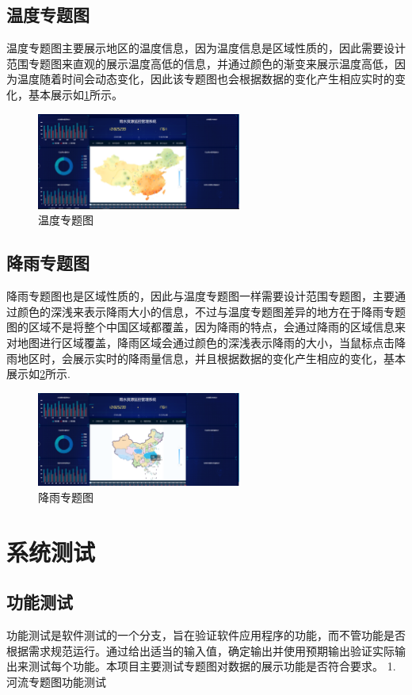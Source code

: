 \subsection{温度专题图}
温度专题图主要展示地区的温度信息，因为温度信息是区域性质的，因此需要设计范围专题图来直观的展示温度高低的信息，并通过颜色的渐变来展示温度高低，因为温度随着时间会动态变化，因此该专题图也会根据数据的变化产生相应实时的变化，基本展示如\ref{fig:wendu}所示。
\begin{figure}[!htb]%
	\centering
	\includegraphics[width=0.60\textwidth]{figs/温度图.png}
	\caption{温度专题图}
	\label{fig:wendu}
\end{figure}
\subsection{降雨专题图}
降雨专题图也是区域性质的，因此与温度专题图一样需要设计范围专题图，主要通过颜色的深浅来表示降雨大小的信息，不过与温度专题图差异的地方在于降雨专题图的区域不是将整个中国区域都覆盖，因为降雨的特点，会通过降雨的区域信息来对地图进行区域覆盖，降雨区域会通过颜色的深浅表示降雨的大小，当鼠标点击降雨地区时，会展示实时的降雨量信息，并且根据数据的变化产生相应的变化，基本展示如\ref{fig:jiangyu}所示.
\begin{figure}[!htb]%
	\centering
	\includegraphics[width=0.60\textwidth]{figs/降雨.png}
	\caption{降雨专题图}
	\label{fig:jiangyu}
\end{figure}
\section{系统测试}
\subsection{功能测试}
功能测试是软件测试的一个分支，旨在验证软件应用程序的功能，而不管功能是否根据需求规范运行。通过给出适当的输入值，确定输出并使用预期输出验证实际输出来测试每个功能。本项目主要测试专题图对数据的展示功能是否符合要求。
1.河流专题图功能测试

